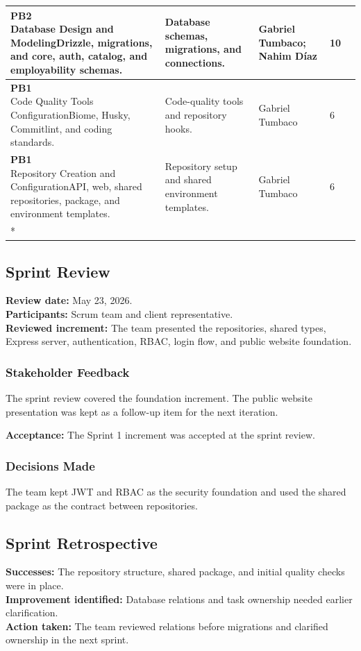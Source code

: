 \documentclass[letterpaper%
, oneside%
, 12pt%
, memoireprojet%
, english%
,creativecommons,hyperref, withAlgo2e %
]{thETS}
\newcommand{\tablelastrow}{%
    \\* \hline
}
\newcommand{\pbhu}[3]{%
    #1 &
    #2%
}
\begin{document}
\begin{longtable}{|L{1.0cm}|L{4.0cm}|L{5.4cm}|L{2.7cm}|L{1.3cm}|}
\hline
\pbhu{8}{\textbf{PB2}\newline Database Design and Modeling}{Drizzle, migrations, and core, auth, catalog, and employability schemas.} & Database schemas, migrations, and connections. & Gabriel Tumbaco; Nahim Díaz & 10 \\
\hline
\pbhu{9}{\textbf{PB1}\newline Code Quality Tools Configuration}{Biome, Husky, Commitlint, and coding standards.} & Code-quality tools and repository hooks. & Gabriel Tumbaco & 6 \\
\hline
\pbhu{10}{\textbf{PB1}\newline Repository Creation and Configuration}{API, web, shared repositories, package, and environment templates.} & Repository setup and shared environment templates. & Gabriel Tumbaco & 6 \tablelastrow
\end{longtable}
\endgroup

\subsection{Sprint Review}
\textbf{Review date:} May 23, 2026.\\
\textbf{Participants:} Scrum team and client representative.\\
\textbf{Reviewed increment:} The team presented the repositories, shared types, Express server,
authentication, RBAC, login flow, and public website foundation.

\subsubsection{Stakeholder Feedback}
The sprint review covered the foundation increment. The public website presentation was kept
as a follow-up item for the next iteration.

\textbf{Acceptance:} The Sprint 1 increment was accepted at the sprint review.

\subsubsection{Decisions Made}
The team kept JWT and RBAC as the security foundation and used the shared package as the contract
between repositories.

\subsection{Sprint Retrospective}
\textbf{Successes:} The repository structure, shared package, and initial quality checks were in place.\\
\textbf{Improvement identified:} Database relations and task ownership needed earlier clarification.\\
\textbf{Action taken:} The team reviewed relations before migrations and clarified ownership in the next sprint.
\end{document}
